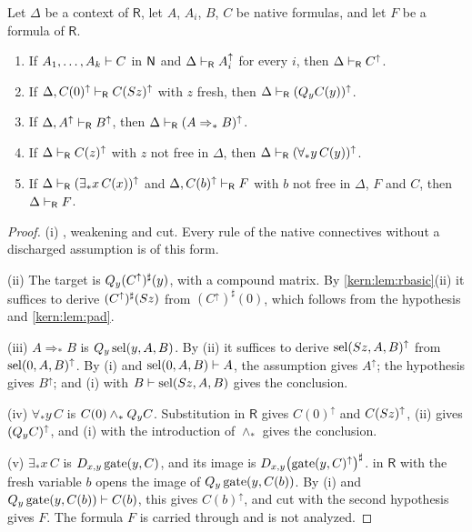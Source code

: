 \begin{lemma}
\label{kern:lem:image}
Let $\Delta$ be a context of $\mathsf{R}$, let $A$, $A_i$, $B$, $C$ be
native formulas, and let $F$ be a formula of $\mathsf{R}$.
\begin{enumerate}[label=\textup{(\roman*)}]
\item If $A_1,\dots,A_k\vdash C$ in $\mathsf{N}$ and
 $\Delta\vdash_{\mathsf{R}}A_i^{\uparrow}$ for every $i$, then
 $\Delta\vdash_{\mathsf{R}}C^{\uparrow}$.
\item If $\Delta,C(0)^{\uparrow}\vdash_{\mathsf{R}}C(S z)^{\uparrow}$
 with $z$ fresh, then $\Delta\vdash_{\mathsf{R}}(Q_{y}C(y))^{\uparrow}$.
\item If $\Delta,A^{\uparrow}\vdash_{\mathsf{R}}B^{\uparrow}$, then
 $\Delta\vdash_{\mathsf{R}}(A\Rightarrow_* B)^{\uparrow}$.
\item If $\Delta\vdash_{\mathsf{R}}C(z)^{\uparrow}$ with $z$ not free in
 $\Delta$, then $\Delta\vdash_{\mathsf{R}}(\forall_* y\,C(y))^{\uparrow}$.
\item If $\Delta\vdash_{\mathsf{R}}(\exists_* x\,C(x))^{\uparrow}$ and
 $\Delta,C(b)^{\uparrow}\vdash_{\mathsf{R}}F$ with $b$ not free in $\Delta$,
 $F$ and $C$, then $\Delta\vdash_{\mathsf{R}}F$.
\end{enumerate}
\end{lemma}

\begin{proof}
(i) , weakening and cut.  Every rule of the native
connectives without a discharged assumption is of this form.

(ii) The target is $Q_{y}(C^{\uparrow})^{\sharp}(y)$, with a compound matrix.
By \cref{kern:lem:rbasic}(ii) it suffices to derive
$(C^{\uparrow})^{\sharp}(S z)$ from $(C^{\uparrow})^{\sharp}(0)$, which
follows from the hypothesis and \cref{kern:lem:pad}.

(iii) $A\Rightarrow_* B$ is $Q_{y}\operatorname{sel}(y,A,B)$.  By (ii) it suffices to
derive $\operatorname{sel}(S z,A,B)^{\uparrow}$ from $\operatorname{sel}(0,A,B)^{\uparrow}$.  By (i)
and $\operatorname{sel}(0,A,B)\vdash A$, the assumption gives $A^{\uparrow}$; the
hypothesis gives $B^{\uparrow}$; and (i) with $B\vdash\operatorname{sel}(S z,A,B)$
gives the conclusion.

(iv) $\forall_* y\,C$ is $C(0)\wedge_*Q_{y}C$.  Substitution in
$\mathsf{R}$ gives $C(0)^{\uparrow}$ and $C(S z)^{\uparrow}$, (ii) gives
$(Q_{y}C)^{\uparrow}$, and (i) with the introduction of $\wedge_*$ gives the
conclusion.

(v) $\exists_* x\,C$ is $D_{x,y}\operatorname{gate}(y,C)$, and its image is
$D_{x,y}\bigl(\operatorname{gate}(y,C)^{\uparrow}\bigr)^{\sharp}$.
 in $\mathsf{R}$ with the fresh variable $b$ opens the image of
$Q_{y}\operatorname{gate}(y,C(b))$.  By (i) and
$Q_{y}\operatorname{gate}(y,C(b))\vdash C(b)$, this gives
$C(b)^{\uparrow}$, and cut with the second hypothesis gives $F$.  The
formula $F$ is carried through  and is not analyzed.
\end{proof}

